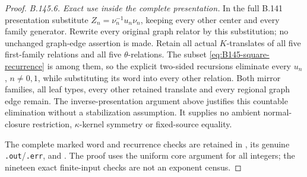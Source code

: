 \begin{proof}
\emph{B.145.6. Exact use inside the complete presentation.}
In the full B.141 presentation substitute
$Z_n=\nu_n^{-1}u_n\nu_n$, keeping every other center and every
family generator. Rewrite every original graph relator by this
substitution; no unchanged graph-edge assertion is made. Retain
all actual $K$-translates of all five first-family relations and
all five $\theta$-relations. The subset
\eqref{eq:B145-square-recurrence} is among them, so the explicit
two-sided recursions eliminate every $u_n$, $n\ne0,1$, while
substituting its word into every other relation. Both mirror
families, all leaf types, every other retained translate and every
regional graph edge remain. The inverse-presentation argument
above justifies this countable elimination without a stabilization
assumption. It supplies no ambient normal-closure restriction,
$\kappa$-kernel symmetry or fixed-source equality.

The complete marked word and recurrence checks are retained in
, its genuine
\texttt{.out}/\texttt{.err}, and
.
The proof uses the uniform core argument for all integers; the
nineteen exact finite-input checks are not an exponent census.
\end{proof}
